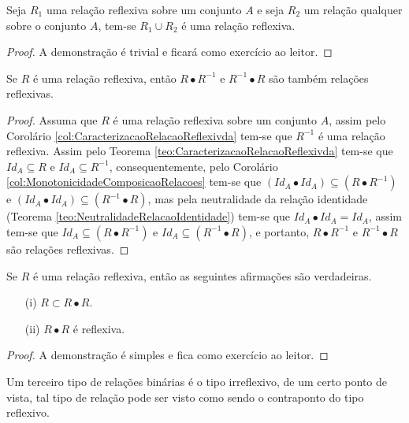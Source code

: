 \begin{teorema}
	Seja $R_1$ uma relação reflexiva sobre um conjunto $A$ e seja $R_2$ um relação qualquer sobre o conjunto $A$, tem-se $R_1 \cup R_2$ é uma relação reflexiva.
\end{teorema}

\begin{proof}
	A demonstração é trivial e ficará como exercício ao leitor.
\end{proof}

\begin{teorema}
	Se $R$ é uma relação reflexiva, então $R \bullet R^{-1}$ e $R^{-1} \bullet R$ são também relações reflexivas.
\end{teorema}

\begin{proof}
	Assuma que $R$ é uma relação reflexiva sobre um conjunto $A$, assim pelo Corolário \ref{col:CaracterizacaoRelacaoReflexivda} tem-se que $R^{-1}$ é uma relação reflexiva. Assim pelo Teorema \ref{teo:CaracterizacaoRelacaoReflexivda} tem-se que $Id_A \subseteq R$ e $Id_A \subseteq R^{-1}$, consequentemente, pelo Corolário \ref{col:MonotonicidadeComposicaoRelacoes} tem-se que $(Id_A \bullet Id_A) \subseteq (R \bullet R^{-1})$ e $(Id_A \bullet Id_A) \subseteq (R^{-1} \bullet R)$, mas pela neutralidade da relação identidade (Teorema \ref{teo:NeutralidadeRelacaoIdentidade}) tem-se que $Id_A \bullet Id_A = Id_A$, assim tem-se que  $Id_A \subseteq (R \bullet R^{-1})$ e $Id_A \subseteq (R^{-1} \bullet R)$, e portanto, $R \bullet R^{-1}$ e $R^{-1} \bullet R$ são relações reflexivas.
\end{proof}

\begin{teorema}
	Se $R$ é uma relação reflexiva, então as seguintes afirmações são verdadeiras.
	\begin{itemize}
		\item[(i)] $R \subset R \bullet R$.
		\item[(ii)] $R \bullet R$ é reflexiva.
	\end{itemize}
\end{teorema}

\begin{proof}
	A demonstração é simples e fica como exercício ao leitor.
\end{proof}

Um terceiro tipo de relações binárias é o tipo irreflexivo, de um certo ponto de vista, tal tipo de relação pode ser visto como sendo o contraponto do tipo reflexivo.

